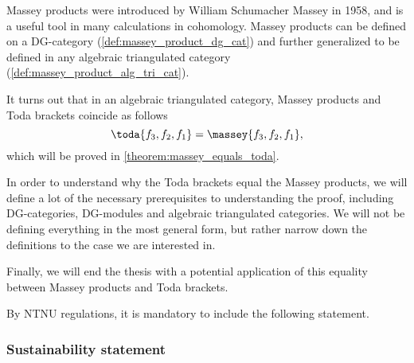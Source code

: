 Massey products were introduced by William Schumacher Massey in 1958, and is a useful tool in many calculations in cohomology. Massey products can be defined on a DG-category (\autoref{def:massey_product_dg_cat}) and further generalized to be defined in any algebraic triangulated category (\autoref{def:massey_product_alg_tri_cat}).

It turns out that in an algebraic triangulated category, Massey products and Toda brackets coincide as follows
\[
    \toda{f_3, f_2, f_1} = \massey{f_3, f_2, f_1},
\]
which will be proved in \autoref{theorem:massey_equals_toda}.

In order to understand why the Toda brackets equal the Massey products, we will define a lot of the necessary prerequisites to understanding the proof, including DG-categories, DG-modules and algebraic triangulated categories. We will not be defining everything in the most general form, but rather narrow down the definitions to the case we are interested in.

Finally, we will end the thesis with a potential application of this equality between Massey products and Toda brackets.

By NTNU regulations, it is mandatory to include the following statement.
\subsubsection{Sustainability statement}

